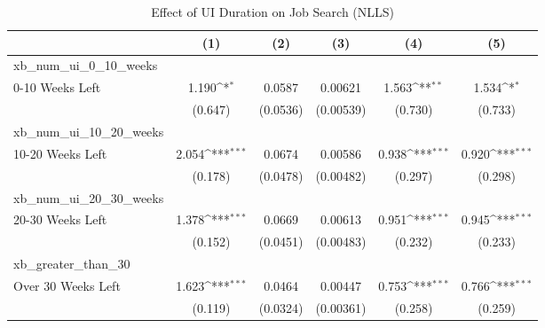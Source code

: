 \begin{table}[htbp]\centering
\def\sym#1{\ifmmode^{#1}\else\(^{#1}\)\fi}
\caption{Effect of UI Duration on Job Search (NLLS) \label{tab:sophregs}}
\begin{tabular}{l*{5}{c}}
\hline\hline
                    &\multicolumn{1}{c}{(1)}         &\multicolumn{1}{c}{(2)}         &\multicolumn{1}{c}{(3)}         &\multicolumn{1}{c}{(4)}         &\multicolumn{1}{c}{(5)}         \\
\hline
xb\_num\_ui\_0\_10\_weeks&                     &                     &                     &                     &                     \\
0-10 Weeks Left     &       1.190\sym{*}  &      0.0587         &     0.00621         &       1.563\sym{**} &       1.534\sym{*}  \\
                    &     (0.647)         &    (0.0536)         &   (0.00539)         &     (0.730)         &     (0.733)         \\
\hline
xb\_num\_ui\_10\_20\_weeks&                     &                     &                     &                     &                     \\
10-20 Weeks Left    &       2.054\sym{***}&      0.0674         &     0.00586         &       0.938\sym{***}&       0.920\sym{***}\\
                    &     (0.178)         &    (0.0478)         &   (0.00482)         &     (0.297)         &     (0.298)         \\
\hline
xb\_num\_ui\_20\_30\_weeks&                     &                     &                     &                     &                     \\
20-30 Weeks Left    &       1.378\sym{***}&      0.0669         &     0.00613         &       0.951\sym{***}&       0.945\sym{***}\\
                    &     (0.152)         &    (0.0451)         &   (0.00483)         &     (0.232)         &     (0.233)         \\
\hline
xb\_greater\_than\_30  &                     &                     &                     &                     &                     \\
Over 30 Weeks Left  &       1.623\sym{***}&      0.0464         &     0.00447         &       0.753\sym{***}&       0.766\sym{***}\\
                    &     (0.119)         &    (0.0324)         &   (0.00361)         &     (0.258)         &     (0.259)         \\

\end{tabular}
\end{table}

